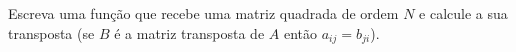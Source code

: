 
\question[10]

Escreva uma função que recebe uma matriz quadrada de ordem $N$ e calcule a sua transposta (se $B$ é a matriz transposta de $A$ então $a_{ij} = b_{ji}$).
